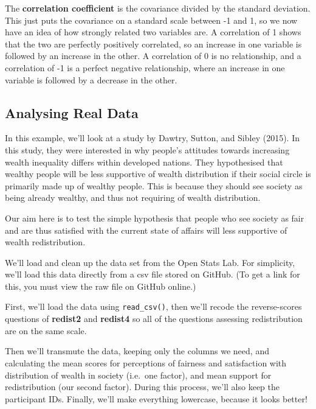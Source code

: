 \documentclass[
]{book}
\begin{document}
The \textbf{correlation coefficient} is the covariance divided by the standard deviation. This just puts the covariance on a standard scale between -1 and 1, so we now have an idea of how strongly related two variables are. A correlation of 1 shows that the two are perfectly positively correlated, so an increase in one variable is followed by an increase in the other. A correlation of 0 is no relationship, and a correlation of -1 is a perfect negative relationship, where an increase in one variable is followed by a decrease in the other.

\hypertarget{analysing-real-data}{%
\subsection{Analysing Real Data}\label{analysing-real-data}}

In this example, we'll look at a study by Dawtry, Sutton, and Sibley (2015). In this study, they were interested in why people's attitudes towards increasing wealth inequality differs within developed nations. They hypothesised that wealthy people will be less supportive of wealth distribution if their social circle is primarily made up of wealthy people. This is because they should see society as being already wealthy, and thus not requiring of wealth distribution.

Our aim here is to test the simple hypothesis that people who see society as fair and are thus satisfied with the current state of affairs will less supportive of wealth redistribution.

We'll load and clean up the data set from the Open Stats Lab. For simplicity, we'll load this data directly from a csv file stored on GitHub. (To get a link for this, you must view the raw file on GitHub online.)

First, we'll load the data using \texttt{read\_csv()}, then we'll recode the reverse-scores questions of \textbf{redist2} and \textbf{redist4} so all of the questions assessing redistribution are on the same scale.

Then we'll transmute the data, keeping only the columns we need, and calculating the mean scores for perceptions of fairness and satisfaction with distribution of wealth in society (i.e.~one factor), and mean support for redistribution (our second factor).
During this process, we'll also keep the participant IDs. Finally, we'll make everything lowercase, because it looks better!
\end{document}
